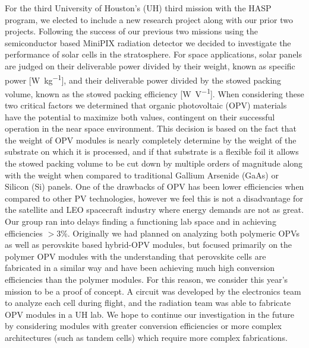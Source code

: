 	For the third University of Houston's (UH) third mission with the HASP program, we elected to include a new research project along with our prior two projects. Following the success of our previous two missions \cite{SORA1} \cite{SORA2} using the semiconductor based MiniPIX radiation detector we decided to investigate the performance of solar cells in the stratosphere. For space applications, solar panels are judged on their deliverable power divided by their weight, known as specific power [\si{\watt\per\kilo\gram}], and their deliverable power divided by the stowed packing volume, known as the stowed packing efficiency [\si{\watt\per\volt}]. When considering these two critical factors we determined that organic photovoltaic (OPV) materials have the potential to maximize both values, contingent on their successful operation in the near space environment. This decision is based on the fact that the weight of OPV modules is nearly completely determine by the weight of the substrate on which it is processed, and if that substrate is a flexible foil it allows the stowed packing volume to be cut down by multiple orders of magnitude along with the weight when compared to traditional Gallium Arsenide (GaAs) or Silicon (Si) panels. One of the drawbacks of OPV has been lower efficiencies when compared to other PV technologies, however we feel this is not a disadvantage for the satellite and LEO spacecraft industry where energy demands are not as great.\\
	
	 Our group ran into delays finding a functioning lab space and in achieving efficiencies $>$3\%. Originally we had planned on analyzing both polymeric OPVs as well as perovskite based hybrid-OPV modules, but focused primarily on the polymer OPV modules with the understanding that perovskite cells are fabricated in a similar way and have been achieving much high conversion efficiencies than the polymer modules. For this reason, we consider this year's mission to be a proof of concept. A circuit was developed by the electronics team to analyze each cell during flight, and the radiation team was able to fabricate OPV modules in a UH lab. We hope to continue our investigation in the future by considering modules with greater conversion efficiencies or more complex architectures (such as tandem cells) which require more complex fabrications. 
